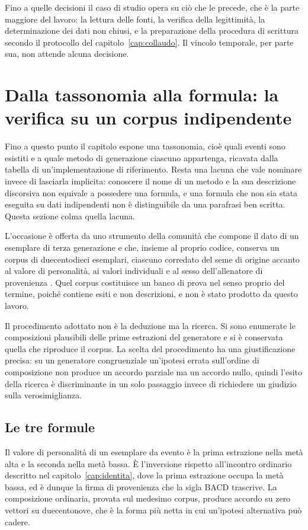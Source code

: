 Fino a quelle decisioni il caso di studio opera su ciò che le precede, che è la parte maggiore del lavoro: la lettura delle fonti, la verifica della legittimità, la determinazione dei dati non chiusi, e la preparazione della procedura di scrittura secondo il protocollo del capitolo~\ref{cap:collaudo}. Il vincolo temporale, per parte sua, non attende alcuna decisione.

\section{Dalla tassonomia alla formula: la verifica su un corpus indipendente}

Fino a questo punto il capitolo espone una tassonomia, cioè quali eventi sono esistiti e a quale metodo di generazione ciascuno appartenga, ricavata dalla tabella di un'implementazione di riferimento. Resta una lacuna che vale nominare invece di lasciarla implicita: conoscere il nome di un metodo e la sua descrizione discorsiva non equivale a possedere una formula, e una formula che non sia stata eseguita su dati indipendenti non è distinguibile da una parafrasi ben scritta. Questa sezione colma quella lacuna.

L'occasione è offerta da uno strumento della comunità che compone il dato di un esemplare di terza generazione e che, insieme al proprio codice, conserva un corpus di duecentodieci esemplari, ciascuno corredato del seme di origine accanto al valore di personalità, ai valori individuali e al sesso dell'allenatore di provenienza \cite{gen3-ace-builder}. Quel corpus costituisce un banco di prova nel senso proprio del termine, poiché contiene esiti e non descrizioni, e non è stato prodotto da questo lavoro.

Il procedimento adottato non è la deduzione ma la ricerca. Si sono enumerate le composizioni plausibili delle prime estrazioni del generatore e si è conservata quella che riproduce il corpus. La scelta del procedimento ha una giustificazione precisa: su un generatore congruenziale un'ipotesi errata sull'ordine di composizione non produce un accordo parziale ma un accordo nullo, quindi l'esito della ricerca è discriminante in un solo passaggio invece di richiedere un giudizio sulla verosimiglianza.

\subsection*{Le tre formule}

Il valore di personalità di un esemplare da evento è la prima estrazione nella metà alta e la seconda nella metà bassa. È l'inversione rispetto all'incontro ordinario descritto nel capitolo~\ref{cap:identita}, dove la prima estrazione occupa la metà bassa, ed è dunque la firma di provenienza che la sigla BACD trascrive. La composizione ordinaria, provata sul medesimo corpus, produce accordo su zero vettori su duecentonove, che è la forma più netta in cui un'ipotesi alternativa può cadere.

